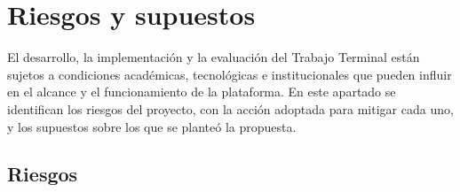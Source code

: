\section{Riesgos y supuestos}
\label{sec:riesgos_supuestos}
\label{sec:limitaciones}
El desarrollo, la implementación y la evaluación del Trabajo Terminal están sujetos a condiciones académicas, tecnológicas e institucionales que pueden influir en el alcance y el funcionamiento de la plataforma. En este apartado se identifican los riesgos del proyecto, con la acción adoptada para mitigar cada uno, y los supuestos sobre los que se planteó la propuesta.

\subsection{Riesgos}

